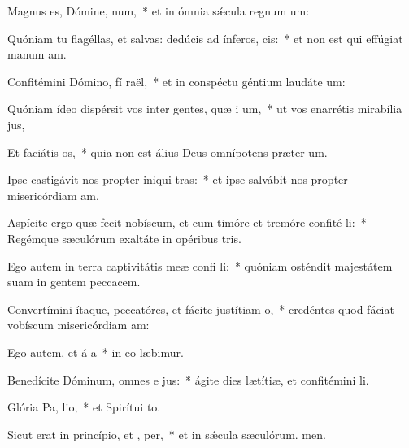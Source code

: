\item Magnus es, Dómine,  num,~* et in ómnia sǽcula regnum um:
\item Quóniam tu flagéllas, et salvas: dedúcis ad ínferos,  cis:~* et non est qui effúgiat manum am.
\item Confitémini Dómino, fí raël,~* et in conspéctu géntium laudáte um:
\item Quóniam ídeo dispérsit vos inter gentes, quæ i um,~* ut vos enarrétis mirabília jus,
\item Et faciátis  os,~* quia non est álius Deus omnípotens præter um.
\item Ipse castigávit nos propter iniqui tras:~* et ipse salvábit nos propter misericórdiam am.
\item Aspícite ergo quæ fecit nobíscum, et cum timóre et tremóre confité li:~* Regémque sæculórum exaltáte in opéribus tris.
\item Ego autem in terra captivitátis meæ confi li:~* quóniam osténdit majestátem suam in gentem peccacem.
\item Convertímini ítaque, peccatóres, et fácite justítiam  o,~* credéntes quod fáciat vobíscum misericórdiam am:
\item Ego autem, et á a~* in eo læbimur.
\item Benedícite Dóminum, omnes e jus:~* ágite dies lætítiæ, et confitémini li.
\item Glória Pa,  lio,~* et Spirítui to.
\item Sicut erat in princípio, et ,  per,~* et in sǽcula sæculórum. men.
